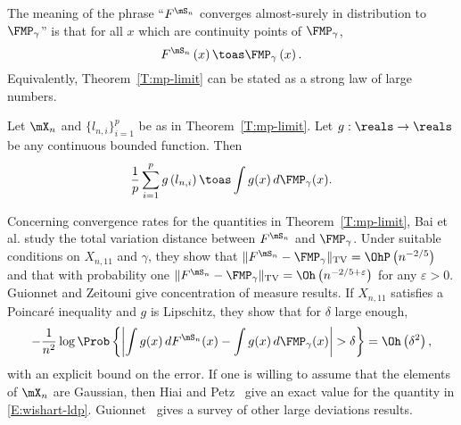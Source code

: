 The meaning of the phrase ``$F^{\mS_n}$ converges almost-surely in distribution to $\FMP_\gamma$'' is that for all $x$ which are continuity points of $\FMP_\gamma$,
\begin{equation}\label{E:spectral-measure-limit-point}
    F^{\mS_n} \left(
        x
    \right)
    \toas
    \FMP_\gamma \left(
        x
    \right).
\end{equation}
Equivalently, Theorem~\ref{T:mp-limit} can be stated as a strong law of large numbers.

\begin{corollary}\label{C:wishart-lln}
    Let $\mX_n$ and $\{ l_{n,i} \}_{i=1}^{p}$ be as in 
    Theorem~\ref{T:mp-limit}.  Let $g : \reals \to \reals$ be any
    continuous bounded function.  Then
    \begin{equation}\label{E:wishart-functional-limit}
        \frac{1}{p}
        \sum_{i=1}^p
            g \left( l_{n,i} \right)
        \toas
        \int
            g(x)
            \,
            d\FMP_\gamma ( x ).
    \end{equation}
\end{corollary}

Concerning convergence rates for the quantities in Theorem~\ref{T:mp-limit},  Bai et al. \cite{bai2003crs} study the total variation distance between $F^{\mS_n}$ and $\FMP_\gamma$.  Under suitable conditions on $X_{n,11}$ and $\gamma$, they show that
\(
    \| F^{\mS_n} - \FMP_\gamma \|_\text{TV}
    =
    \OhP\left( n^{-2/5} \right)
\)
and that with probability one
\(
    \| F^{\mS_n} - \FMP_\gamma \|_\text{TV}
    =
    \Oh\left( n^{-2/5 + \varepsilon} \right)
\)
for any $\varepsilon > 0$.
Guionnet and Zeitouni \cite{guionnet2000csm} give concentration of measure results.  If $X_{n,11}$ satisfies a Poincar\'e inequality and $g$ is Lipschitz, they show that for $\delta$ large enough,
\begin{equation}\label{E:wishart-ldp}
    -
    \frac{1}{n^2}
    \log \Prob\left\{ 
        \left|
            \int g(x) \, dF^{\mS_n}(x) - \int g(x) \, d\FMP_\gamma(x)
        \right|
        >
        \delta
    \right\}
    =
    \Oh\left(
        \delta^2
    \right),
\end{equation}
with an explicit bound on the error. If one is willing to assume that the elements of $\mX_n$ are Gaussian, then Hiai and Petz~\cite{hiai1998edw} give an exact value for the quantity in \eqref{E:wishart-ldp}.  Guionnet~\cite{guionnetlds} gives a survey of other large deviations results.  

